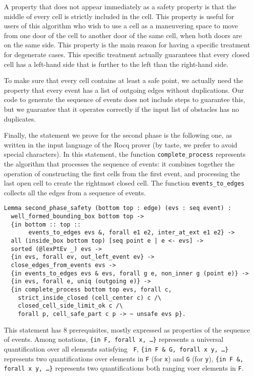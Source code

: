 \documentclass[a4paper, USenglish, cleveref, autoref, thm-restate, final]{lipics-v2021}
\begin{document}
A property that does not appear immediately as a safety property is
that the middle of every cell is strictly included in the cell.  This
property is useful for users of this algorithm who wish to use a cell
as a maneuvering space to move from one door of the cell to another door of
the same cell, when both doors are on the same side.  This property is
the main reason for having a specific treatment for degenerate cases.
This specific treatment actually guarantees that every closed cell has
a left-hand side that is further to the left than the
right-hand side.

To make sure that every cell contains at least a safe point, we
actually need the property that every event has a list of outgoing
edges without duplications.  Our code to generate the sequence of
events does not include steps to guarantee this, but we guarantee
that it operates correctly if the input
list of obstacles has no duplicates.

Finally, the statement we prove for the second phase is the following one,
as written in the input language of the Rocq prover (by taste, we prefer
to avoid special characters).  In this statement, the function
{\tt complete\_process} represents the algorithm that processes the sequence of
events: it combines together the operation of constructing the first cells
from the first event, and processing the last open cell to create the rightmost
closed cell.  The function {\tt events\_to\_edges} collects all the edges
from a sequence of events.
\begin{verbatim}
Lemma second_phase_safety (bottom top : edge) (evs : seq event) :
  well_formed_bounding_box bottom top ->
  {in bottom :: top ::
       events_to_edges evs &, forall e1 e2, inter_at_ext e1 e2} ->
  all (inside_box bottom top) [seq point e | e <- evs] ->
  sorted (@lexPtEv _) evs ->
  {in evs, forall ev, out_left_event ev} ->
  close_edges_from_events evs ->
  {in events_to_edges evs & evs, forall g e, non_inner g (point e)} ->
  {in evs, forall e, uniq (outgoing e)} ->
  {in complete_process bottom top evs, forall c,
    strict_inside_closed (cell_center c) c /\
    closed_cell_side_limit_ok c /\
    forall p, cell_safe_part c p -> ~ unsafe evs p}.
\end{verbatim}
This statement has 8 prerequisites, mostly expressed as properties of the
sequence of events.  Among notations, {\tt \{in F, forall x, \dots\}}
represents a universal quantification over all elements satisfying {\tt
  F}, {\tt \{in F \& G, forall x y, \dots\}} represents two
quantifications over elements in {\tt F} (for {\tt x}) and {\tt G}
(for {\tt y}), {\tt \{in F \&, forall x y, \dots\}} represents two
quantifications both ranging voer elements in {\tt F}.
\end{document}
